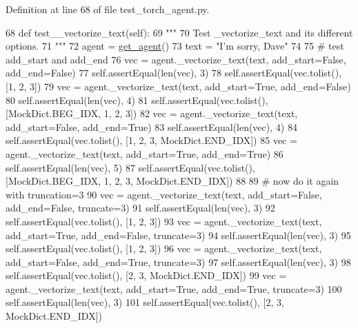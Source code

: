 Definition at line 68 of file test\+\_\+torch\+\_\+agent.\+py.


\begin{DoxyCode}
68     \textcolor{keyword}{def }test\_\_vectorize\_text(self):
69         \textcolor{stringliteral}{"""}
70 \textcolor{stringliteral}{        Test \_vectorize\_text and its different options.}
71 \textcolor{stringliteral}{        """}
72         agent = \hyperlink{namespacetests_1_1test__torch__agent_ae929d109305aaea29fbfa13ecf1f32e9}{get\_agent}()
73         text = \textcolor{stringliteral}{"I'm sorry, Dave"}
74 
75         \textcolor{comment}{# test add\_start and add\_end}
76         vec = agent.\_vectorize\_text(text, add\_start=\textcolor{keyword}{False}, add\_end=\textcolor{keyword}{False})
77         self.assertEqual(len(vec), 3)
78         self.assertEqual(vec.tolist(), [1, 2, 3])
79         vec = agent.\_vectorize\_text(text, add\_start=\textcolor{keyword}{True}, add\_end=\textcolor{keyword}{False})
80         self.assertEqual(len(vec), 4)
81         self.assertEqual(vec.tolist(), [MockDict.BEG\_IDX, 1, 2, 3])
82         vec = agent.\_vectorize\_text(text, add\_start=\textcolor{keyword}{False}, add\_end=\textcolor{keyword}{True})
83         self.assertEqual(len(vec), 4)
84         self.assertEqual(vec.tolist(), [1, 2, 3, MockDict.END\_IDX])
85         vec = agent.\_vectorize\_text(text, add\_start=\textcolor{keyword}{True}, add\_end=\textcolor{keyword}{True})
86         self.assertEqual(len(vec), 5)
87         self.assertEqual(vec.tolist(), [MockDict.BEG\_IDX, 1, 2, 3, MockDict.END\_IDX])
88 
89         \textcolor{comment}{# now do it again with truncation=3}
90         vec = agent.\_vectorize\_text(text, add\_start=\textcolor{keyword}{False}, add\_end=\textcolor{keyword}{False}, truncate=3)
91         self.assertEqual(len(vec), 3)
92         self.assertEqual(vec.tolist(), [1, 2, 3])
93         vec = agent.\_vectorize\_text(text, add\_start=\textcolor{keyword}{True}, add\_end=\textcolor{keyword}{False}, truncate=3)
94         self.assertEqual(len(vec), 3)
95         self.assertEqual(vec.tolist(), [1, 2, 3])
96         vec = agent.\_vectorize\_text(text, add\_start=\textcolor{keyword}{False}, add\_end=\textcolor{keyword}{True}, truncate=3)
97         self.assertEqual(len(vec), 3)
98         self.assertEqual(vec.tolist(), [2, 3, MockDict.END\_IDX])
99         vec = agent.\_vectorize\_text(text, add\_start=\textcolor{keyword}{True}, add\_end=\textcolor{keyword}{True}, truncate=3)
100         self.assertEqual(len(vec), 3)
101         self.assertEqual(vec.tolist(), [2, 3, MockDict.END\_IDX])

\end{DoxyCode}
